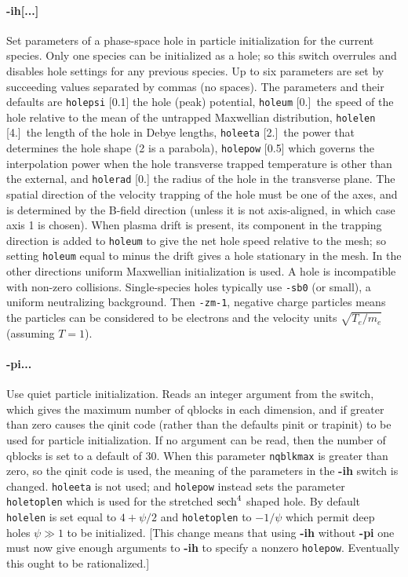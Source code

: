 \documentclass[12pt]{article}
\begin{document}
\paragraph{-ih[...]} Set parameters of a phase-space hole in particle
initialization for the current species. Only one species can be
initialized as a hole; so this switch overrules and disables hole
settings for any previous species. Up to six parameters are set by
succeeding values separated by commas (no spaces). The parameters and
their defaults are \verb!holepsi! [0.1] the hole (peak) potential,
\verb!holeum! [0.]\ the speed of the hole relative to the mean of the
untrapped Maxwellian distribution, \verb!holelen! [4.]\ the length of
the hole in Debye lengths, \verb!holeeta! [2.]\ the power that
determines the hole shape (2 is a parabola), \verb!holepow! [0.5]
which governs the interpolation power when the hole transverse trapped
temperature is other than the external, and \verb!holerad! [0.] the
radius of the hole in the transverse plane.  The spatial direction of
the velocity trapping of the hole must be one of the axes, and is
determined by the B-field direction (unless it is not axis-aligned, in
which case axis 1 is chosen). When plasma drift is present, its
component in the trapping direction is added to \verb!holeum! to give
the net hole speed relative to the mesh; so setting \verb!holeum! equal to
minus the drift gives a hole stationary in the mesh.  In the other directions
uniform Maxwellian initialization is used. A hole is incompatible with
non-zero collisions. Single-species holes typically use \verb!-sb0!
(or small), a uniform neutralizing background. Then \verb!-zm-1!,
negative charge particles means the particles can be considered to be
electrons and the velocity units $\sqrt{T_e/m_e}$ (assuming $T=1$).

\paragraph{-pi...} Use quiet particle initialization. Reads an integer
argument from the switch, which gives the maximum number of qblocks in
each dimension, and if greater than zero causes the qinit code (rather
than the defaults pinit or trapinit) to be used for particle
initialization. If no argument can be read, then the number of qblocks
is set to a default of 30. When this parameter \verb!nqblkmax! is
greater than zero, so the qinit code is used, the meaning of the
parameters in the \textbf{-ih} switch is changed. \verb!holeeta! is
not used; and \verb!holepow! instead sets the parameter \verb!holetoplen!
which is used for the stretched ${\rm sech}^4$ shaped hole. By default 
\verb!holelen! is set equal to $4+\psi/2$ and \verb!holetoplen! to
$-1/\psi$ which permit deep holes $\psi\gg1$ to be initialized.
[This change means that using {\bf -ih} without {\bf -pi} one must now
give enough arguments to {\bf -ih} to specify a nonzero
\verb!holepow!. Eventually this ought to be rationalized.]
\end{document}
